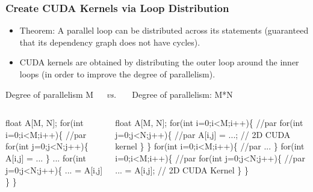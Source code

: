 \documentclass{beamer}
\newcommand{\emp}[1]{\textcolor{DikuRed}{ #1}}
\newcommand{\emphh}[1]{\textcolor{CosGreen}{ #1}}
\begin{document}
\begin{frame}[fragile,t]
  \frametitle{Create CUDA Kernels via Loop Distribution} %


\begin{itemize}
\item \emp{Theorem:} A parallel loop can be distributed across
                its statements (guaranteed that its
                dependency graph does not have cycles).\smallskip

\item CUDA kernels are obtained by distributing the outer loop 
                around the inner loops (in order to improve
                the degree of parallelism). 
\end{itemize}

\begin{block}{Degree of parallelism M{\tt~~~}{\em vs.}{\tt~~~} Degree of parallelism: M*N}
\begin{columns}
\begin{colorcode}
\emphh{float A[M, N];}
\emphh{for(int i=0;i<M;i++)\{ //par}
  for(int j=0;j<N;j++)\{
    A[i,j] = ...
  \}
  ...
  for(int j=0;j<N;j++)\{
    ... = A[i,j]
  \}  
\}
\end{colorcode}
\begin{colorcode}
\emphh{float A[M, N];}
\emphh{for(int i=0;i<M;i++)\{ //par}
  \emphh{for(int j=0;j<N;j++)\{ //par}
    A[i,j] = ...; \emp{// 2D CUDA kernel}
\} \}
\emphh{for(int i=0;i<M;i++)\{ //par}
  ...
\}
\emphh{for(int i=0;i<M;i++)\{ //par}
  \emphh{for(int j=0;j<N;j++)\{ //par}
    ... = A[i,j]; \emp{// 2D CUDA Kernel}
\} \}
\end{colorcode}
\end{columns}
\end{block} 

\end{frame}
\end{document}
